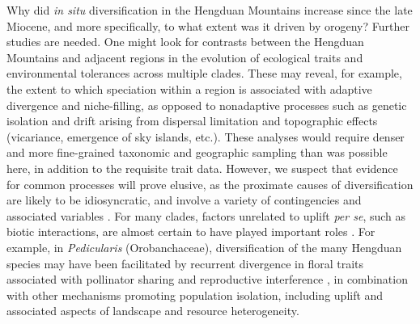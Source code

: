 \documentclass[9pt,twocolumn,twoside,lineno]{pnas-new}
\begin{document}
Why did \textit{in situ} diversification in the Hengduan Mountains
increase since the late Miocene, and more specifically, to what extent
was it driven by orogeny? Further studies are needed. One might look
for contrasts between the Hengduan Mountains and adjacent regions in
the evolution of ecological traits and environmental tolerances
\citep[e.g.,][]{liu2016} across multiple clades. These may reveal, for
example, the extent to which speciation within a region is associated
with adaptive divergence and niche-filling, as opposed to nonadaptive
processes such as genetic isolation and drift arising from dispersal
limitation and topographic effects (vicariance, emergence of sky
islands, etc.). These analyses would require denser and more
fine-grained taxonomic and geographic sampling than was possible here,
in addition to the requisite trait data. However, we suspect that
evidence for common processes will prove elusive, as the proximate
causes of diversification are likely to be idiosyncratic, and involve
a variety of contingencies and associated variables
\citep[e.g.,][]{donoghue2015,bouchenak2015}. For many clades, factors
unrelated to uplift \emph{per se}, such as biotic interactions, are
almost certain to have played important roles
\citep{Luebert2014,Wen2014,Renner2016}. For example, in
\emph{Pedicularis} (Orobanchaceae), diversification of the many
Hengduan species may have been facilitated by recurrent divergence in
floral traits associated with pollinator sharing and reproductive
interference \citep[e.g.,][]{eaton2012}, in combination with other
mechanisms promoting population isolation, including uplift and
associated aspects of landscape and resource heterogeneity.

\end{document}
